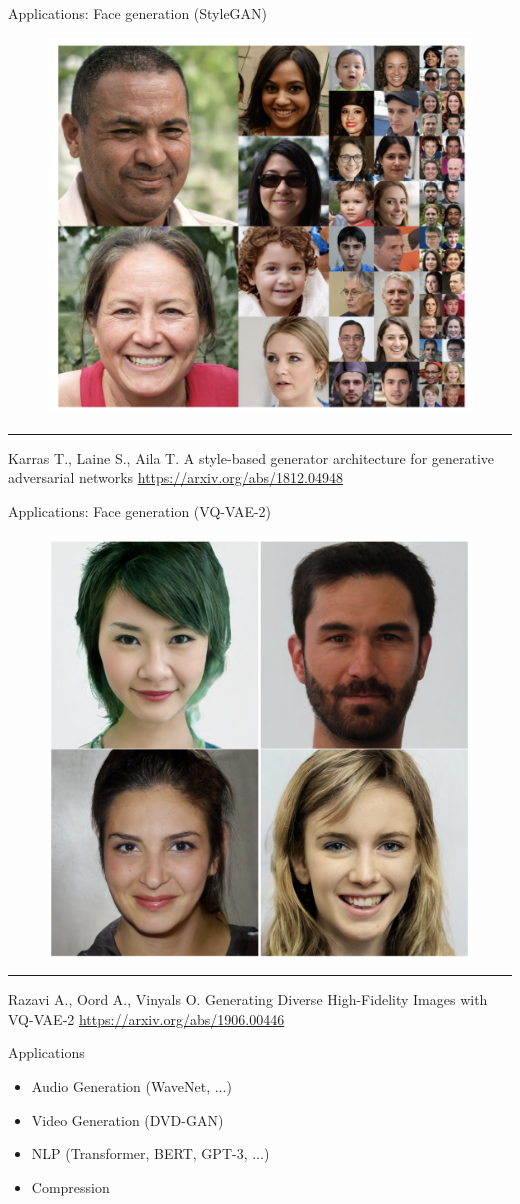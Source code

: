 \begin{frame}{Applications: Face generation (StyleGAN)}
    \begin{figure}
        \centering
        \includegraphics[width=0.65\linewidth]{figs/stylegan.png}
        \label{fig:stylegan}
    \end{figure}
\vfill
\hrule\medskip
{\scriptsize Karras T., Laine S., Aila T. A style-based generator architecture for generative adversarial networks  \href{https://arxiv.org/abs/1812.04948}{https://arxiv.org/abs/1812.04948}}
\end{frame}
\begin{frame}{Applications: Face generation (VQ-VAE-2)}
    \begin{figure}
        \centering
        \includegraphics[width=0.65\linewidth]{figs/vq_vae.png}
        \label{fig:vq_vae}
    \end{figure}
\vfill
\hrule\medskip
{\scriptsize Razavi A., Oord A., Vinyals O. Generating Diverse High-Fidelity Images with VQ-VAE-2 \href{https://arxiv.org/abs/1906.00446}{https://arxiv.org/abs/1906.00446}}
\end{frame}
\begin{frame}{Applications}
\begin{itemize}
    \item Audio Generation (WaveNet, ...)
    \item Video Generation (DVD-GAN)
    \item NLP (Transformer, BERT, GPT-3, ...)
    \item Compression
\end{itemize}
\end{frame}
